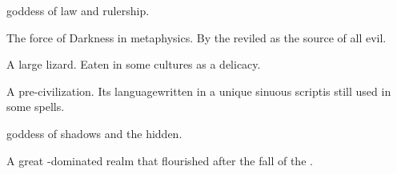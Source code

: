 \documentclass
  [a4paper,
   12pt,
   oneside
  ]%
  {article}
\begin{document}
\begin{gloss}
\begin{comment}
\paragraph{Isxae}
\end{comment}
\gitem{\Isxae}
\Ortaican goddess of law and rulership.



\begin{comment}
\subsection{\itzach}
\end{comment}
\gitem{\Itzach}
The force of Darkness in  metaphysics. 
By the  reviled as the source of all evil. 



\begin{comment}
\paragraph{mosca}
\end{comment}
A large lizard. 
Eaten in some cultures as a delicacy.



\begin{comment}
\paragraph{Kush}
\end{comment}
A pre-\scathaese civilization. 
Its language\dash written in a unique sinuous script\dash is still used in some spells. 



\begin{comment}
\paragraph{Nasshikerr}
\end{comment}
\gitem{\Nasshikerr}
\Ortaican goddess of shadows and the hidden.



\begin{comment}
\paragraph{\Ortaica}
\end{comment}
\gitem{\Ortaica}
A great -dominated realm that flourished after the fall of the . 




\end{gloss}
\end{document}
